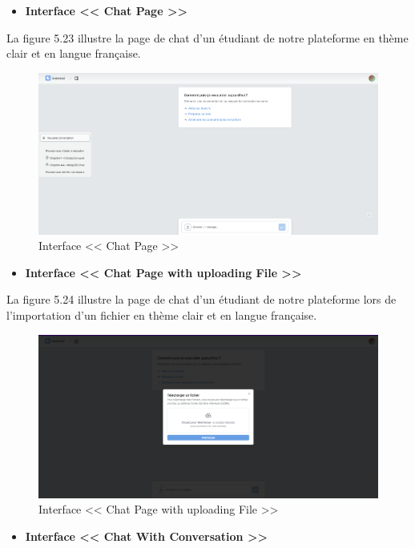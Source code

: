 \begin{itemize}
    \item \textbf{Interface << Chat Page >>}
\end{itemize}
La figure 5.23 illustre la page de chat d'un étudiant de notre plateforme en thème clair et en langue française.
\begin{figure}[H]
    \centering
    \includegraphics[width=1.1\textwidth,height=0.5\textwidth]{images/chp5/fig23.png}
    \caption{Interface << Chat Page >>}
    \label{Interface << Chat Page >>}    
\end{figure}
\begin{itemize}
    \item \textbf{Interface << Chat Page with uploading File >>}
\end{itemize}
La figure 5.24 illustre la page de chat d'un étudiant de notre plateforme lors de l'importation d'un fichier en thème clair et en langue française.
\begin{figure}[H]
    \centering
    \includegraphics[width=1.1\textwidth,height=0.5\textwidth]{images/chp5/fig24.png}
    \caption{Interface << Chat Page with uploading File >>}
    \label{Interface << Chat Page with uploading File >>}    
\end{figure}
\begin{itemize}
    \item \textbf{Interface << Chat With Conversation >>}
\end{itemize}
